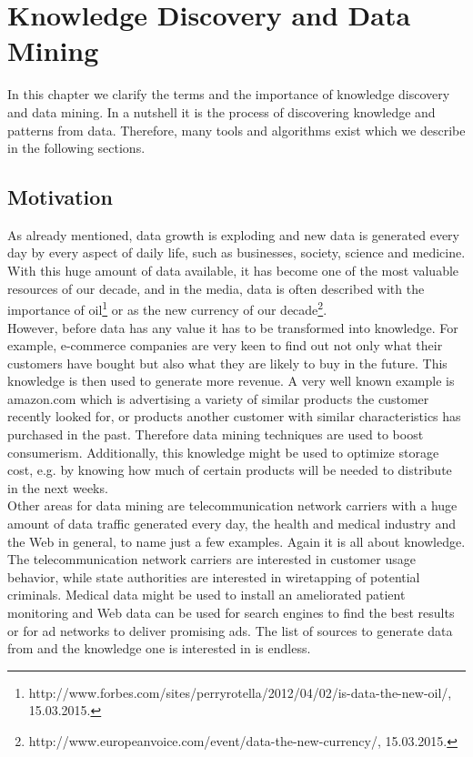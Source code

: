 \chapter{Knowledge Discovery and Data Mining}\label{chapter:kdd}
In this chapter we clarify the terms and the importance of knowledge discovery and data mining. In a nutshell it is the process of discovering knowledge and patterns from data. Therefore, many tools and algorithms exist which we describe in the following sections.
\section{Motivation}
As already mentioned, data growth is exploding and new data is generated every day by every aspect of daily life, such as businesses, society, science and medicine. With this huge amount of data available, it has become one of the most valuable resources of our decade, and in the media, data is often described with the importance of oil\footnote{http://www.forbes.com/sites/perryrotella/2012/04/02/is-data-the-new-oil/, 15.03.2015.} or as the new currency of our decade\footnote{http://www.europeanvoice.com/event/data-the-new-currency/, 15.03.2015.}. 
\\
However, before data has any value it has to be transformed into knowledge. For example, e-commerce companies are very keen to find out not only what their customers have bought but also what they are likely to buy in the future. This knowledge is then used to generate more revenue. A very well known example is amazon.com which is advertising a variety of similar products the customer recently looked for, or products another customer with similar characteristics has purchased in the past. Therefore data mining techniques are used to boost consumerism. Additionally, this knowledge might be used to optimize storage cost, e.g. by knowing how much of certain products will be needed to distribute in the next weeks.
\\
Other areas for data mining are telecommunication network carriers with a huge amount of data traffic generated every day, the health and medical industry and the Web in general, to name just a few examples. Again it is all about knowledge. The telecommunication network carriers are interested in customer usage behavior, while state authorities are interested in wiretapping of potential criminals. Medical data might be used to install an ameliorated patient monitoring and Web data can be used for search engines to find the best results or for ad networks to deliver promising ads. The list of sources to generate data from and the knowledge one is interested in is endless.


